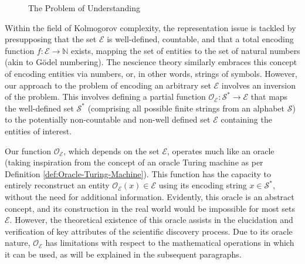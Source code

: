 \begin{figure}[t]
\centering
{}
\caption{\label{fig:representationProblem}The Problem of Understanding}
\end{figure}

Within the field of Kolmogorov complexity, the representation issue is tackled by presupposing that the set $\mathcal{E}$ is well-defined, countable, and that a total encoding function $f:\mathcal{E} \rightarrow \mathbb{N}$ exists, mapping the set of entities to the set of natural numbers (akin to Gödel numbering). The nescience theory similarly embraces this concept of encoding entities via numbers, or, in other words, strings of symbols. However, our approach to the problem of encoding an arbitrary set $\mathcal{E}$ involves an inversion of the problem. This involves defining a partial function $\mathcal{O}_\mathcal{E}:\mathcal{S}^\ast \rightarrow \mathcal{E}$ that maps the well-defined set $\mathcal{S}^\ast$ (comprising all possible finite strings from an alphabet $\mathcal{S}$) to the potentially non-countable and non-well defined set $\mathcal{E}$ containing the entities of interest.

Our function $\mathcal{O}_\mathcal{E}$, which depends on the set $\mathcal{E}$, operates much like an oracle (taking inspiration from the concept of an oracle Turing machine as per Definition \ref{def:Oracle-Turing-Machine}). This function has the capacity to entirely reconstruct an entity $\mathcal{O}_\mathcal{E} (x) \in \mathcal{E}$ using its encoding string $x \in \mathcal{S}^\ast$, without the need for additional information. Evidently, this oracle is an abstract concept, and its construction in the real world would be impossible for most sets $\mathcal{E}$. However, the theoretical existence of this oracle assists in the elucidation and verification of key attributes of the scientific discovery process. Due to its oracle nature, $\mathcal{O}_\mathcal{E}$ has limitations with respect to the mathematical operations in which it can be used, as will be explained in the subsequent paragraphs.

